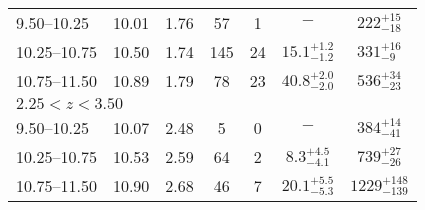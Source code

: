 \begin{table*}
\begin{tabular}{lc|c|c c|c c}
9.50--10.25              & 10.01        & 1.76 & 57  & 1        & $-$                    & $222^{+15}_{-18}$     \T \B \\
10.25--10.75     & 10.50        & 1.74 & 145 & 24       & $15.1^{+1.2}_{-1.2}$   & $331^{+16}_{- 9}$     \T \B \\
10.75--11.50     & 10.89        & 1.79 & 78  & 23       & $40.8^{+2.0}_{-2.0}$   & $536^{+34}_{-23}$     \T \B \\
\hline 
\hline
\multicolumn{7}{l}{$2.25<z<3.50$}\\  
\hline                                                                                   
9.50--10.25              & 10.07        & 2.48  & 5   & 0   & $-$                        & $ 384^{+ 14}_{- 41}$  \T \B \\
10.25--10.75     & 10.53        & 2.59  & 64  & 2       & $ 8.3^{+4.5}_{-4.1}$   & $ 739^{+ 27}_{- 26}$ \T \B \\
10.75--11.50     & 10.90        & 2.68  & 46  & 7   & $20.1^{+5.5}_{-5.3}$       & $1229^{+148}_{-139}$ \T \B \\
\hline
\end{tabular}%
\end{table*}
  

